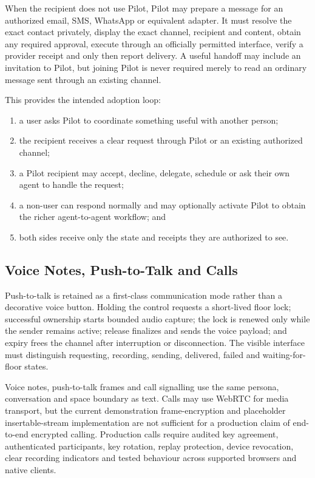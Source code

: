 When the recipient does not use Pilot, Pilot may prepare a message for an
authorized email, SMS, WhatsApp or equivalent adapter. It must resolve the exact
contact privately, display the exact channel, recipient and content, obtain any
required approval, execute through an officially permitted interface, verify a
provider receipt and only then report delivery. A useful handoff may include an
invitation to Pilot, but joining Pilot is never required merely to read an
ordinary message sent through an existing channel.

This provides the intended adoption loop:

\begin{enumerate}
  \item a user asks Pilot to coordinate something useful with another person;
  \item the recipient receives a clear request through Pilot or an existing
        authorized channel;
  \item a Pilot recipient may accept, decline, delegate, schedule or ask their
        own agent to handle the request;
  \item a non-user can respond normally and may optionally activate Pilot to
        obtain the richer agent-to-agent workflow; and
  \item both sides receive only the state and receipts they are authorized to
        see.
\end{enumerate}

\subsection{Voice Notes, Push-to-Talk and Calls}

Push-to-talk is retained as a first-class communication mode rather than a
decorative voice button. Holding the control requests a short-lived floor lock;
successful ownership starts bounded audio capture; the lock is renewed only
while the sender remains active; release finalizes and sends the voice payload;
and expiry frees the channel after interruption or disconnection. The visible
interface must distinguish requesting, recording, sending, delivered, failed
and waiting-for-floor states.

Voice notes, push-to-talk frames and call signalling use the same persona,
conversation and space boundary as text. Calls may use WebRTC for media
transport, but the current demonstration frame-encryption and placeholder
insertable-stream implementation are not sufficient for a production claim of
end-to-end encrypted calling. Production calls require audited key agreement,
authenticated participants, key rotation, replay protection, device revocation,
clear recording indicators and tested behaviour across supported browsers and
native clients.

